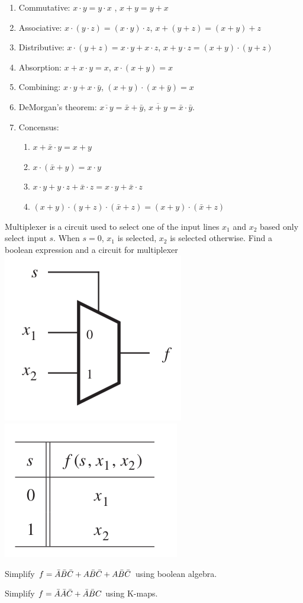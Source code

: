 \begin{enumerate}
\item Commutative: $x\cdot y = y \cdot x$ , $x + y = y + x$
  \vspace{10em}
\item Associative: $x\cdot(y\cdot z) = (x \cdot y) \cdot z$, $x+(y+ z) = (x + y) + z$
  \vspace{10em}
\item Distributive: $x\cdot(y + z) = x \cdot y + x \cdot z$, $x + y \cdot z = (x + y) \cdot (y + z)$
  \vspace{10em}
\item Absorption: $x + x\cdot y = x$, $x \cdot (x+y) = x$
  \vspace{10em}
\item Combining: $x \cdot y + x \cdot \bar{y}$, $(x+y) \cdot (x + \bar{y}) = x$
  \vspace{10em}
\item DeMorgan's theorem: $\overline{x \cdot y} = \bar{x} + \bar{y}$,
  $\overline{x + y} = \bar{x} \cdot \bar{y}$.
  \vspace{10em}
\item Concensus:
  \begin{enumerate}
  \item $x + \bar{x}\cdot y = x + y$
    \vspace{10em}
  \item $x \cdot (\bar{x} + y) = x \cdot y$
    \vspace{10em}
  \item $x \cdot y + y\cdot z + \bar{x} \cdot z = x\cdot y + \bar{x} \cdot z$
    \vspace{10em}
  \item $(x + y) \cdot (y+ z) \cdot (\bar{x} + z) = (x+ y) \cdot (\bar{x} + z)$
    \vspace{10em}
  \end{enumerate}
\end{enumerate}

\begin{example}[Multiplexer]
  Multiplexer is a circuit used to select one of the input lines $x_1$ and $x_2$
  based only select input $s$. When $s=0$, $x_1$ is selected, $x_2$ is selected otherwise.
  Find a boolean expression and a circuit for multiplexer\\
  \includegraphics[width=0.2\linewidth]{multiplexer-symbol.png}
  \includegraphics[width=0.2\linewidth]{multiplexer-spec.png}
\end{example}
\vspace{10em}

\begin{example}
  Simplify $f = \bar{A}\bar{B}\bar{C} + A \bar{B}\bar{C} + A\bar{B}\bar{C} $ using boolean algebra.
\end{example}
\vspace{10em}

\begin{example}
  Simplify $f = \bar{A}\bar{A}\bar{C} + \bar{A}\bar{B} C $ using K-maps.
\end{example}
\vspace{10em}